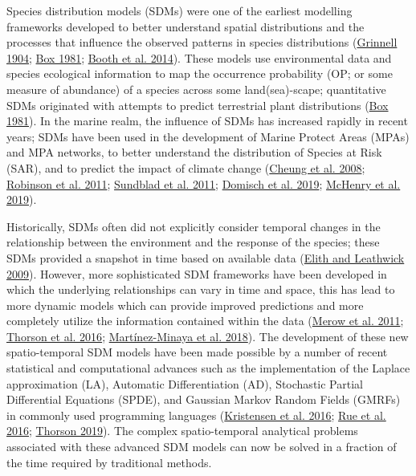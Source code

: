 \documentclass[
]{article}
\begin{document}
Species distribution models (SDMs) were one of the earliest modelling frameworks developed to better understand spatial distributions and the processes that influence the observed patterns in species distributions (\protect\hyperlink{ref-grinnellOriginDistributionChestNutBacked1904}{Grinnell 1904}; \protect\hyperlink{ref-boxPredictingPhysiognomicVegetation1981}{Box 1981}; \protect\hyperlink{ref-boothBioclimFirstSpecies2014}{Booth et al. 2014}). These models use environmental data and species ecological information to map the occurrence probability (OP; or some measure of abundance) of a species across some land(sea)-scape; quantitative SDMs originated with attempts to predict terrestrial plant distributions (\protect\hyperlink{ref-boxPredictingPhysiognomicVegetation1981}{Box 1981}). In the marine realm, the influence of SDMs has increased rapidly in recent years; SDMs have been used in the development of Marine Protect Areas (MPAs) and MPA networks, to better understand the distribution of Species at Risk (SAR), and to predict the impact of climate change (\protect\hyperlink{ref-cheungApplicationMacroecologicalTheory2008}{Cheung et al. 2008}; \protect\hyperlink{ref-robinsonPushingLimitsMarine2011}{Robinson et al. 2011}; \protect\hyperlink{ref-sundbladEcologicalCoherenceMarine2011}{Sundblad et al. 2011}; \protect\hyperlink{ref-domischSpatiallyExplicitSpecies2019}{Domisch et al. 2019}; \protect\hyperlink{ref-mchenryProjectingMarineSpecies2019}{McHenry et al. 2019}).

Historically, SDMs often did not explicitly consider temporal changes in the relationship between the environment and the response of the species; these SDMs provided a snapshot in time based on available data (\protect\hyperlink{ref-elithSpeciesDistributionModels2009}{Elith and Leathwick 2009}). However, more sophisticated SDM frameworks have been developed in which the underlying relationships can vary in time and space, this has lead to more dynamic models which can provide improved predictions and more completely utilize the information contained within the data (\protect\hyperlink{ref-merowDevelopingDynamicMechanistic2011}{Merow et al. 2011}; \protect\hyperlink{ref-thorsonJointDynamicSpecies2016}{Thorson et al. 2016}; \protect\hyperlink{ref-martinez-minayaSpeciesDistributionModeling2018}{Martínez-Minaya et al. 2018}). The development of these new spatio-temporal SDM models have been made possible by a number of recent statistical and computational advances such as the implementation of the Laplace approximation (LA), Automatic Differentiation (AD), Stochastic Partial Differential Equations (SPDE), and Gaussian Markov Random Fields (GMRFs) in commonly used programming languages (\protect\hyperlink{ref-kristensenTMBAutomaticDifferentiation2016}{Kristensen et al. 2016}; \protect\hyperlink{ref-rueBayesianComputingINLA2016}{Rue et al. 2016}; \protect\hyperlink{ref-thorsonGuidanceDecisionsUsing2019}{Thorson 2019}). The complex spatio-temporal analytical problems associated with these advanced SDM models can now be solved in a fraction of the time required by traditional methods.
\end{document}
